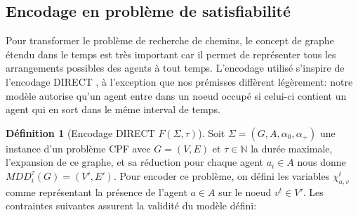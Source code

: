 \documentclass[french, 12pt, letterpaper]{article}
\theoremstyle{definition}
\newtheorem{definition}{Définition}[subsection]
\theoremstyle{proposition}
\theoremstyle{example}
\begin{document}
    

    \subsection{Encodage en problème de satisfiabilité}
    \label{sec:encoding}

    Pour transformer le problème de recherche de chemins, le concept de graphe étendu dans le temps est très important car
    il permet de représenter tous les arrangements possibles des agents à tout temps.
    L'encodage utilisé s'inspire de l'encodage DIRECT \cite{PSURDIRECT}, à l'exception que nos prémisses diffèrent légèrement:
    notre modèle autorise qu'un agent entre dans un noeud occupé si celui-ci contient un agent qui en sort dans le même interval de temps.

    \begin{definition}[Encodage DIRECT $F(\Sigma, \tau)$]
        \label{def:encoding}
        Soit $\Sigma=( G, A, \alpha_0, \alpha_+)$ une instance d'un problème CPF avec $G = ( V, E )$ et $\tau\in \mathbb{N}$
        la durée maximale, l'expansion de ce graphe, et sa réduction pour chaque agent $a_i \in A$ nous donne $MDD^\tau_i(G) = ( V', E' )$.
        Pour encoder ce problème, on défini les variables $\chi_{a, v}^t$ comme représentant la présence de l'agent $a\in A$ sur le noeud $v^t \in V'$.
        Les contraintes suivantes assurent la validité du modèle défini:
        

\end{definition}
\end{document}
